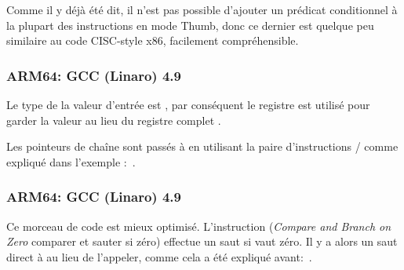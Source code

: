 
Comme il y déjà été dit, il n'est pas possible d'ajouter un prédicat conditionnel
à la plupart des instructions en mode Thumb, donc ce dernier est quelque peu similaire
au code \ac{CISC}-style x86, facilement compréhensible.

\subsubsection{ARM64: GCC (Linaro) 4.9 \NonOptimizing}



Le type de la valeur d'entrée est \Tint, par conséquent le registre  est
utilisé pour garder la valeur au lieu du registre complet .

Les pointeurs de chaîne sont passés à \puts en utilisant la paire d'instructions
/ comme expliqué dans l'exemple \q{\HelloWorldSectionName}:~.

\subsubsection{ARM64: GCC (Linaro) 4.9 \Optimizing}



Ce morceau de code est mieux optimisé.
L'instruction  (\emph{Compare and Branch on Zero} comparer et sauter si zéro)
effectue un saut si  vaut zéro.
Il y a alors un saut direct à \puts au lieu de l'appeler, comme cela a été expliqué
avant:~.
